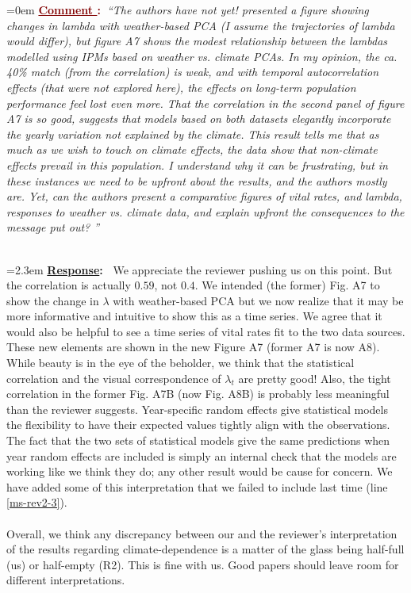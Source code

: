 \documentclass[12pt]{article}
\newcounter{cN}
\newcommand{\comment}[1]{
	\vspace{2em}
	\refstepcounter{cN} %
	\noindent \hangindent=0em \textbf{\textcolor{Maroon}{\uline{Comment \thecN}:~}}\emph{``#1''}
	}
\newcommand{\response}[1]{
	\\[0.25em]
	\hangindent=2.3em \textbf{\textcolor{NavyBlue}{\uline{Response}:~}}#1
	}
\begin{document}
\comment{The authors have not yet! presented a figure showing changes in lambda with weather-based PCA (I assume the trajectories of lambda would differ), but figure A7 shows the modest relationship between the lambdas modelled using IPMs based on weather vs. climate PCAs. In my opinion, the ca. 40\% match (from the correlation) is weak, and with temporal autocorrelation effects (that were not explored here), the effects on long-term population performance feel lost even more. That the correlation in the second panel of figure A7 is so good, suggests that models based on both datasets elegantly incorporate the yearly variation not explained by the climate. This result tells me that as much as we wish to touch on climate effects, the data show that non-climate effects prevail in this population. I understand why it can be frustrating, but in these instances we need to be upfront about the results, and the authors mostly are. Yet, can the authors present a comparative figures of vital rates, and lambda, responses to weather vs. climate data, and explain upfront the consequences to the message put out? 
}
\response{
We appreciate the reviewer pushing us on this point.
But the correlation is actually $0.59$, not $0.4$. 
We intended (the former) Fig. A7 to show the change in $\lambda$ with weather-based PCA but we now realize that it may be more informative and intuitive to show this as a time series. 
We agree that it would also be helpful to see a time series of vital rates fit to the two data sources.
These new elements are shown in the new Figure A7 (former A7 is now A8). 
While beauty is in the eye of the beholder, we think that the statistical correlation and the visual correspondence of $\lambda_{t}$ are pretty good! 
Also, the tight correlation in the former Fig. A7B (now Fig. A8B) is probably less meaningful than the reviewer suggests. 
Year-specific random effects give statistical models the flexibility to have their expected values tightly align with the observations. 
The fact that the two sets of statistical models give the same predictions when year random effects are included is simply an internal check that the models are working like we think they do; any other result would be cause for concern. 
We have added some of this interpretation that we failed to include last time (line \ref{ms-rev2-3}). 
\\
\\
Overall, we think any discrepancy between our and the reviewer's interpretation of the results regarding climate-dependence is a matter of the glass being half-full (us) or half-empty (R2). 
This is fine with us.
Good papers should leave room for different interpretations. 
}
\end{document}
